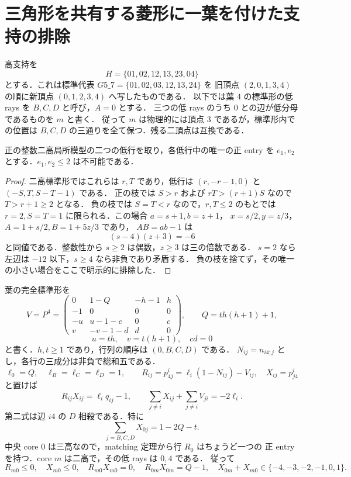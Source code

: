 \section{三角形を共有する菱形に一葉を付けた支持の排除}
\label{g719:section}

高支持を
\[
 H=\{01,02,12,13,23,04\}
\]
とする．これは標準代表 $G5\_7=\{01,02,03,12,13,24\}$ を
旧頂点 $(2,0,1,3,4)$ の順に新頂点 $(0,1,2,3,4)$ へ写したものである．
以下では葉 $4$ の標準形の低 rays を $B,C,D$ と呼び，$A=0$ とする．
三つの低 rays のうち $0$ との辺が低分母であるものを $m$ と書く．
従って $m$ は物理的には頂点 $3$ であるが，標準形内での位置は
$B,C,D$ の三通りを全て保つ．残る二頂点は互換である．

\begin{lemma}
\label{g719:small-positive}
正の整数二高局所模型の二つの低行を取り，各低行中の唯一の正 entry を
$e_1,e_2$ とする．$e_1,e_2\le2$ は不可能である．
\end{lemma}
\begin{proof}
二高標準形ではこれらは $r,T$ であり，低行は
$(r,-r-1,0)$ と $(-S,T,S-T-1)$ である．
正の枝では $S>r$ および $rT>(r+1)S$ なので $T>r+1\ge2$ となる．
負の枝では $S=T<r$ なので，$r,T\le2$ のもとでは
$r=2,S=T=1$ に限られる．この場合 $a=s+1,b=z+1$，
$x=s/2,y=z/3$，$A=1+s/2,B=1+5z/3$ であり，
$AB=ab-1$ は
\[
 (s-4)(z+3)=-6
\]
と同値である．整数性から $s\ge2$ は偶数，$z\ge3$ は三の倍数である．
$s=2$ なら左辺は $-12$ 以下，$s\ge4$ なら非負であり矛盾する．
負の枝を捨てず，その唯一の小さい場合をここで明示的に排除した．
\end{proof}

葉の完全標準形を
\[
 V=P^4=\begin{pmatrix}
 0&1-Q&-h-1&h\\
 -1&0&0&0\\
 -u&u-1-c&0&c\\
 v&-v-1-d&d&0
 \end{pmatrix},
\qquad Q=th(h+1)+1,
\]
\[
 u=th,\quad v=t(h+1),\quad cd=0
\]
と書く．$h,t\ge1$ であり，行列の順序は $(0,B,C,D)$ である．
$N_{ij}=n_{i4;j}$ とし，各行の三成分は非負で総和五である．
\[
 \ell_0=Q,\quad \ell_B=\ell_C=\ell_D=1,\qquad
 R_{ij}=p^i_{4j}=\ell_i(1-N_{ij})-V_{ij},\quad
 X_{ij}=p^i_{j4}
\]
と置けば
\begin{equation}\label{g719:basic}
 R_{ij}X_{ij}=\ell_iq_{ij}-1,
 \qquad
 \sum_{j\ne i}X_{ij}+\sum_{j\ne i}V_{ji}=-2\ell_i.
\end{equation}
第二式は辺 $i4$ の $D$ 相殺である．特に
\begin{equation}\label{g719:hub-D}
 \sum_{j=B,C,D}X_{0j}=1-2Q-t.
\end{equation}
中央 core $0$ は三高なので，matching 定理から行 $R_0$ はちょうど一つの
正 entry を持つ．core $m$ は二高で，その低 rays は $0,4$ である．
従って
\begin{equation}\label{g719:low-pair}
 R_{m0}\le0,\quad X_{m0}\le0,\quad R_{m0}X_{m0}=0,\quad
 R_{0m}X_{0m}=Q-1,\quad X_{0m}+X_{m0}\in\{-4,-3,-2,-1,0,1\}.
\end{equation}

